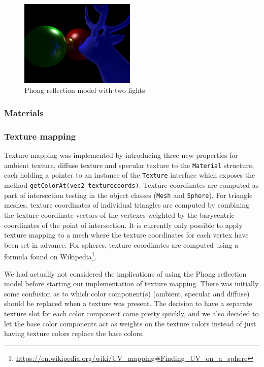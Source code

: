 \documentclass[a4paper,11pt]{article}
\begin{document}
\begin{figure}[H]
\begin{center}
\includegraphics[width=5.5cm]{phong-reflections-demo.png}
\caption{Phong reflection model with two lights}
\end{center}
\end{figure}
\vspace{-0.5cm}

\subsubsection{Materials}
\subsubsection{Texture mapping}
Texture mapping was implemented by introducing three new properties for ambient texture,
diffuse texture and specular texture to the \texttt{Material} structure, each holding a pointer to an
instance of the \texttt{Texture} interface which exposes the method \texttt{getColorAt(vec2 texturecoords)}.
Texture coordinates are computed as part of intersection testing in the object classes
(\texttt{Mesh} and \texttt{Sphere}). For triangle meshes, texture coordinates of
individual triangles are computed by combining the texture coordinate vectors of the vertexes
weighted by the barycentric coordinates of the point of intersection. It is currently
only possible to apply texture mapping to a mesh where the texture coordinates for each vertex
have been set in advance. For spheres, texture coordinates are computed using a formula found
on Wikipedia\footnote{\url{https://en.wikipedia.org/wiki/UV\_mapping\#Finding\_UV\_on\_a\_sphere}}.

We had actually not considered the implications of using the Phong
reflection model before starting our implementation of texture mapping. There was
initially some confusion as to which color component(s) (ambient, specular and diffuse) should
be replaced when a texture was present. The decision to have a separate texture slot for each color component came
pretty quickly, and we also decided to let the base color components act as weights on the
texture colors instead of just having texture colors replace the base colors.
\end{document}
